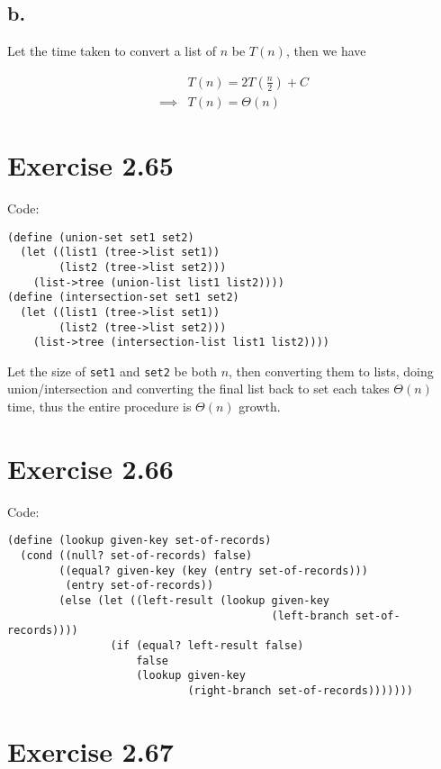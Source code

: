 \documentclass[../main.tex]{subfiles}
\begin{document}
\subsection{b.}

Let the time taken to convert a list of $n$
 be $T(n)$, then we have

\begin{align*}
&T(n) = 2T\left(\frac{n}{2}\right) + C \\
\implies &T(n) = \Theta(n)
\end{align*}

\section{Exercise 2.65}

Code:

\begin{lstlisting}
(define (union-set set1 set2)
  (let ((list1 (tree->list set1))
        (list2 (tree->list set2)))
    (list->tree (union-list list1 list2))))
(define (intersection-set set1 set2)
  (let ((list1 (tree->list set1))
        (list2 (tree->list set2)))
    (list->tree (intersection-list list1 list2))))
\end{lstlisting}

Let the size of \lstinline{set1} and \lstinline{set2}
 be both $n$, then converting them to lists, doing
 union/intersection and converting the final list back
 to set each takes $\Theta(n)$ time, thus the entire
 procedure is $\Theta(n)$ growth.

\section{Exercise 2.66}

Code:

\begin{lstlisting}
(define (lookup given-key set-of-records)
  (cond ((null? set-of-records) false)
        ((equal? given-key (key (entry set-of-records)))
         (entry set-of-records))
        (else (let ((left-result (lookup given-key
                                         (left-branch set-of-records))))
                (if (equal? left-result false)
                    false
                    (lookup given-key
                            (right-branch set-of-records)))))))
\end{lstlisting}

\section{Exercise 2.67}
\end{document}
